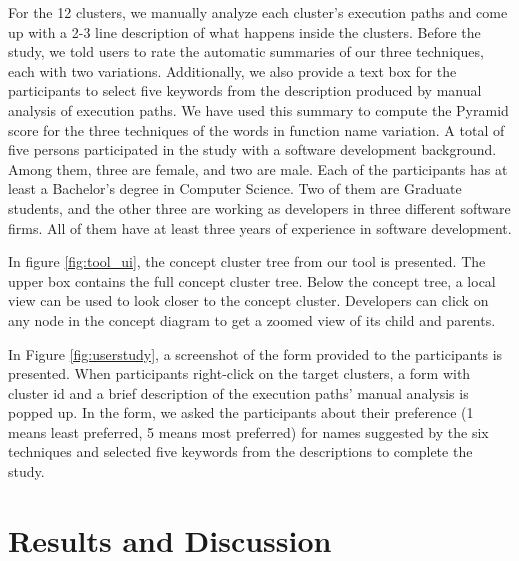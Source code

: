 For the 12 clusters, we manually analyze each cluster's execution paths and come up with a 2-3 line description of what happens inside the clusters. Before the study, we told users to rate the automatic summaries of our three techniques, each with two variations. Additionally, we also provide a text box for the participants to select five keywords from the description produced by manual analysis of execution paths. We have used this summary to compute the Pyramid score for the three techniques of the words in function name variation. A total of five persons participated in the study with a software development background. Among them, three are female, and two are male. Each of the participants has at least a Bachelor's degree in Computer Science. Two of them are Graduate students, and the other three are working as developers in three different software firms. All of them have at least three years of experience in software development.

In figure \ref{fig:tool_ui}, the concept cluster tree from our tool is presented. The upper box contains the full concept cluster tree. Below the concept tree, a local view can be used to look closer to the concept cluster. Developers can click on any node in the concept diagram to get a zoomed view of its child and parents. 

In Figure \ref{fig:userstudy}, a screenshot of the form provided to the participants is presented. When participants right-click on the target clusters, a form with cluster id and a brief description of the execution paths' manual analysis is popped up. In the form, we asked the participants about their preference (1 means least preferred, 5 means most preferred) for names suggested by the six techniques and selected five keywords from the descriptions to complete the study.

\section{Results and Discussion}
\label{results}
